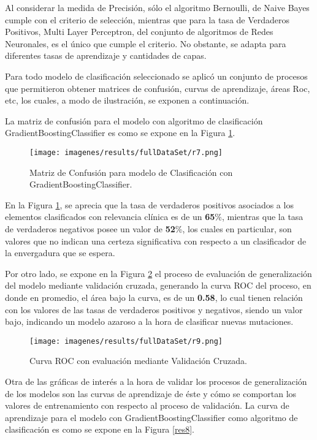 Al considerar la medida de Precisi\'on, s\'olo el algoritmo Bernoulli, de Naive Bayes cumple con el criterio de selecci\'on, mientras que para la tasa de Verdaderos Positivos, Multi Layer Perceptron, del conjunto de algoritmos de Redes Neuronales, es el \'unico que cumple el criterio. No obstante, se adapta para diferentes tasas de aprendizaje y cantidades de capas.

Para todo modelo de clasificaci\'on seleccionado se aplic\'o un conjunto de procesos que permitieron obtener matrices de confusi\'on, curvas de aprendizaje, \'areas Roc, etc, los cuales, a modo de ilustraci\'on, se exponen a continuaci\'on.

La matriz de confusi\'on para el modelo con algoritmo de clasificaci\'on GradientBoostingClassifier es como se expone en la Figura \ref{res6}.

\begin{figure}[!h]
	\centering
	\texttt{[image: imagenes/results/fullDataSet/r7.png]}
	\caption{Matriz de Confusi\'on para modelo de Clasificaci\'on con GradientBoostingClassifier.}
	\label{res6}
\end{figure}

En la Figura \ref{res6}, se aprecia que la tasa de verdaderos positivos asociados a los elementos clasificados con relevancia cl\'inica es de un \textbf{65}\%, mientras que la tasa de verdaderos negativos posee un valor de \textbf{52}\%, los cuales en particular, son valores que no indican una certeza significativa con respecto a un clasificador de la envergadura que se espera.

Por otro lado, se expone en la Figura \ref{res7} el proceso de evaluaci\'on de generalizaci\'on del modelo mediante validaci\'on cruzada, generando la curva ROC del proceso, en donde en promedio, el \'area bajo la curva, es de un \textbf{0.58}, lo cual tienen relaci\'on con los valores de las tasas de verdaderos positivos y negativos, siendo un valor bajo, indicando un modelo azaroso a la hora de clasificar nuevas mutaciones.

\begin{figure}[!h]
	\centering
	\texttt{[image: imagenes/results/fullDataSet/r9.png]}
	\caption{Curva ROC con evaluaci\'on mediante Validaci\'on Cruzada.}
	\label{res7}
\end{figure}

\newpage

Otra de las gr\'aficas de inter\'es a la hora de validar los procesos de generalizaci\'on de los modelos son las curvas de aprendizaje de \'este y c\'omo se comportan los valores de entrenamiento con respecto al proceso de validaci\'on. La curva de aprendizaje para el modelo con GradientBoostingClassifier como algoritmo de clasificaci\'on es como se expone en la Figura \ref{res8}.


